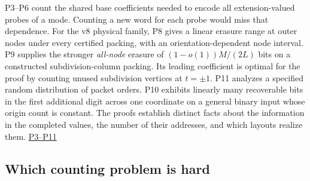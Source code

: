 \documentclass[11pt,a4paper]{article}
\begin{document}
P3--P6 count the shared base coefficients needed to encode all
extension-valued probes of a mode. Counting a new word for each probe
would miss that dependence. For the v8 physical family, P8 gives a
linear erasure range at outer nodes under every certified packing, with
an orientation-dependent node interval. P9 supplies the stronger
\emph{all-node} erasure of \((1-o(1))M/(2L)\) bits on a constructed
subdivision-column packing. Its leading coefficient is optimal for the
proof by counting unused subdivision vertices at \(t=\pm1\). P11
analyzes a specified random distribution of packet orders. P10 exhibits
linearly many recoverable bits in the first additional digit across one
coordinate on a general binary input whose origin count is constant. The
proofs establish distinct facts about the information in the completed
values, the number of their addresses, and which layouts realize them.
\hyperref[v9-section-precision-frontier]{P3--P11}

\subsection{Which counting problem is
hard}\label{v9-which-counting-problem-is-hard}
\end{document}
